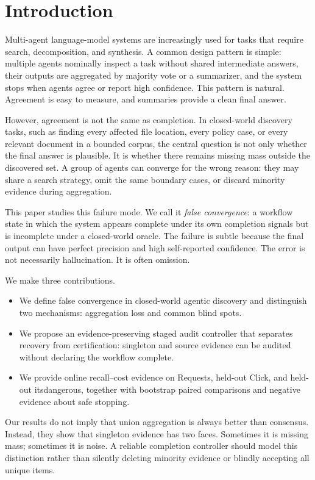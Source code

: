 \documentclass[letterpaper]{article}
\begin{document}
\section{Introduction}

Multi-agent language-model systems are increasingly used for tasks that require
search, decomposition, and synthesis. A common design pattern is simple:
multiple agents nominally inspect a task without shared intermediate answers,
their outputs are aggregated by
majority vote or a summarizer, and the system stops when agents agree or report
high confidence. This pattern is natural. Agreement is easy to measure, and
summaries provide a clean final answer.

However, agreement is not the same as completion. In closed-world discovery
tasks, such as finding every affected file location, every policy case, or every
relevant document in a bounded corpus, the central question is not only whether
the final answer is plausible. It is whether there remains missing mass outside
the discovered set. A group of agents can converge for the wrong reason: they
may share a search strategy, omit the same boundary cases, or discard minority
evidence during aggregation.

This paper studies this failure mode. We call it \emph{false convergence}: a
workflow state in which the system appears complete under its own completion
signals but is incomplete under a closed-world oracle. The failure is subtle
because the final output can have perfect precision and high self-reported
confidence. The error is not necessarily hallucination. It is often omission.

We make three contributions.

\begin{itemize}
    \item We define false convergence in closed-world agentic discovery and
    distinguish two mechanisms: aggregation loss and common blind spots.
    \item We propose an evidence-preserving staged audit controller that
    separates recovery from certification: singleton and source evidence can be
    audited without declaring the workflow complete.
    \item We provide online recall--cost evidence on Requests, held-out Click,
    and held-out itsdangerous, together with bootstrap paired comparisons and
    negative evidence about safe stopping.
\end{itemize}

Our results do not imply that union aggregation is always better than consensus.
Instead, they show that singleton evidence has two faces. Sometimes it is
missing mass; sometimes it is noise. A reliable completion controller should
model this distinction rather than silently deleting minority evidence or
blindly accepting all unique items.
\end{document}
